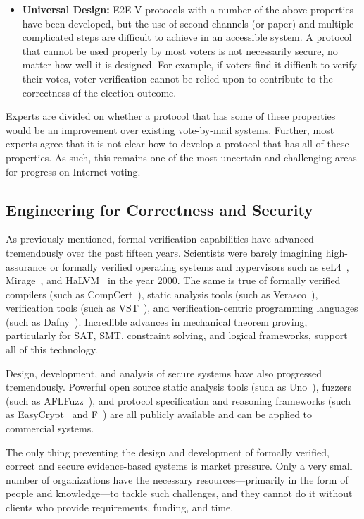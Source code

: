\begin{itemize}
\item \textbf{Universal Design:} E2E-V protocols with a number of the
  above properties have been developed, but the use of second channels
  (or paper) and multiple complicated steps are difficult to achieve
  in an accessible system. A protocol that cannot be used properly by
  most voters is not necessarily secure, no matter how well it is
  designed. For example, if voters find it difficult to verify their
  votes, voter verification cannot be relied upon to contribute to the
  correctness of the election outcome.
\end{itemize}

Experts are divided on whether a protocol that has some of these
properties would be an improvement over existing vote-by-mail
systems. Further, most experts agree that it is not clear how to
develop a protocol that has all of these properties.  As such, this
remains one of the most uncertain and challenging areas for progress
on Internet voting.

\subsection{Engineering for Correctness and Security}

As previously mentioned, formal verification capabilities have
advanced tremendously over the past fifteen years. Scientists were
barely imagining high-assurance or formally verified operating systems
and hypervisors such as seL4~\cite{klein2009sel4},
Mirage~\cite{OpenMirage}, and HaLVM~\cite{HaLVM} in the year 2000. The
same is true of formally verified compilers (such as
CompCert~\cite{CompCert}), static analysis tools (such as
Verasco~\cite{Verasco}), verification tools (such as VST~\cite{VST}),
and verification-centric programming languages (such as
Dafny~\cite{Dafny}). Incredible advances in mechanical theorem
proving, particularly for SAT, SMT, constraint solving, and logical
frameworks, support all of this technology.

Design, development, and analysis of secure systems have also
progressed tremendously. Powerful open source static analysis tools
(such as Uno~\cite{holzmann2002static}), fuzzers (such as
AFLFuzz~\cite{AFLFuzz}), and protocol specification and reasoning
frameworks (such as EasyCrypt~\cite{EasyCrypt} and F\*~\cite{Fstar})
are all publicly available and can be applied to commercial systems.

The only thing preventing the design and development of formally
verified, correct and secure evidence-based systems is market
pressure. Only a very small number of organizations have the necessary
resources---primarily in the form of people and knowledge---to tackle
such challenges, and they cannot do it without clients who provide
requirements, funding, and time.

